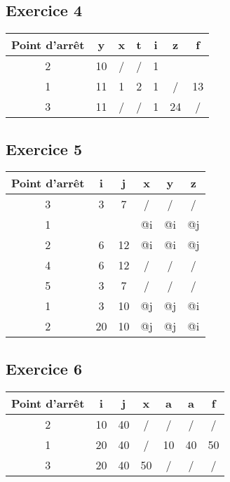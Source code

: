 \subsection{Exercice 4}

\begin{center}
\begin{tabular}{c |  c  c  c  c  c  c  }
	\textbf{Point d'arrêt} & \textbf{y} & \textbf{x} & \textbf{t} & \textbf{i} & \textbf{z} & \textbf{f}\\
	\hline
	2 & 10 & / & / & 1 && \\
	\hline
	1 & 11 & 1 & 2 & 1 & / & 13\\
	\hline
	3 & 11 & / & / & 1 & 24 & /\\
	\hline
\end{tabular}
\end{center}
\newpage
\subsection{Exercice 5}

\begin{center}
\begin{tabular}{c |  c  c  c  c  c  }
	\textbf{Point d'arrêt} & \textbf{i} & \textbf{j} & \textbf{x} & \textbf{y} & \textbf{z}\\
	\hline
	3 & 3 & 7 &/ &/&/\\
	\hline
	1 & &&@i&@i&@j\\
	\hline
	2 & 6 & 12 & @i & @i & @j\\
	\hline
	4 & 6 & 12 & / & / & /\\
	\hline
	5 & 3 & 7 & / & / & / \\
	\hline
	1 & 3&10 &@j&@j&@i\\
	\hline
	2 & 20 & 10 & @j&@j&@i\\
	\hline
\end{tabular}
\end{center}
\newpage
\subsection{Exercice 6}
 
\begin{tabular}{c |  c  c  c  c  c  c  }
	\textbf{Point d'arrêt} & \textbf{i} & \textbf{j} & \textbf{x} & \textbf{a} & \textbf{a} & \textbf{f}\\
	\hline
	2&10&40&/&/&/&/\\
	\hline
	1 & 20 & 40 & / & 10 & 40 & 50\\
	\hline
	3 & 20 & 40 & 50 & / & / & /\\
	\hline
\end{tabular}

